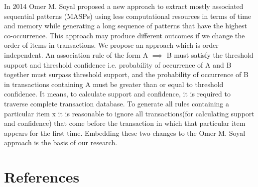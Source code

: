 \documentclass[preprint]{elsarticle}
\begin{document}
In 2014 Omer M. Soyal \cite{oldmasp} proposed a new approach to extract mostly associated sequential patterns (MASPs) using less computational resources in terms of time and memory while generating a long sequence of patterns that have the highest co-occurrence.
This approach may produce different outcomes if we change the order of items in transactions. We propose an approach which is order independent. An association rule of the form A $\implies$ B must satisfy the threshold support and threshold confidence i.e. probability of occurrence of A and B together must surpass threshold support, and the probability of occurrence of B in transactions containing A must be greater than or equal to threshold confidence. It means, to calculate support and confidence, it is required to traverse complete transaction database. To generate all rules containing a particular item x it is reasonable to ignore all transactions(for calculating support and confidence) that come before the transaction in which that particular item appears for the first time. Embedding these two changes to the Omer M. Soyal \cite{oldmasp} approach is the basis of our research.

\section*{References}

\end{document}
